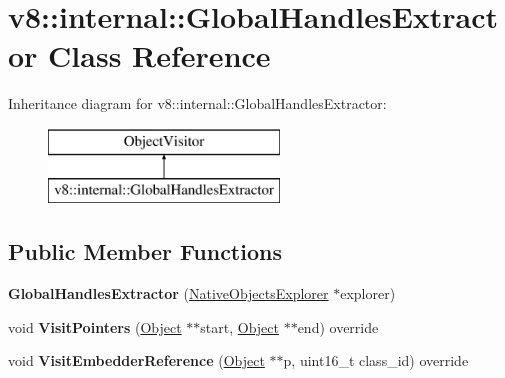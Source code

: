 \hypertarget{classv8_1_1internal_1_1_global_handles_extractor}{}\section{v8\+:\+:internal\+:\+:Global\+Handles\+Extractor Class Reference}
\label{classv8_1_1internal_1_1_global_handles_extractor}
Inheritance diagram for v8\+:\+:internal\+:\+:Global\+Handles\+Extractor\+:\begin{figure}[H]
\begin{center}
\leavevmode
\includegraphics[height=2.000000cm]{classv8_1_1internal_1_1_global_handles_extractor}
\end{center}
\end{figure}
\subsection*{Public Member Functions}
\begin{DoxyCompactItemize}
\item 
{\bfseries Global\+Handles\+Extractor} (\hyperlink{classv8_1_1internal_1_1_native_objects_explorer}{Native\+Objects\+Explorer} $\ast$explorer)\hypertarget{classv8_1_1internal_1_1_global_handles_extractor_a7bf2d1963cb622b0a74570723b6d43d4}{}\label{classv8_1_1internal_1_1_global_handles_extractor_a7bf2d1963cb622b0a74570723b6d43d4}

\item 
void {\bfseries Visit\+Pointers} (\hyperlink{classv8_1_1internal_1_1_object}{Object} $\ast$$\ast$start, \hyperlink{classv8_1_1internal_1_1_object}{Object} $\ast$$\ast$end) override\hypertarget{classv8_1_1internal_1_1_global_handles_extractor_ac14da05b0955f79691c832527da75059}{}\label{classv8_1_1internal_1_1_global_handles_extractor_ac14da05b0955f79691c832527da75059}

\item 
void {\bfseries Visit\+Embedder\+Reference} (\hyperlink{classv8_1_1internal_1_1_object}{Object} $\ast$$\ast$p, uint16\+\_\+t class\+\_\+id) override\hypertarget{classv8_1_1internal_1_1_global_handles_extractor_a415d00f74296e15864a960564664e9c7}{}\label{classv8_1_1internal_1_1_global_handles_extractor_a415d00f74296e15864a960564664e9c7}

\end{DoxyCompactItemize}
